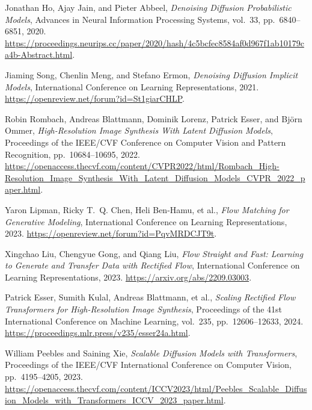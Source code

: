 
Jonathan Ho, Ajay Jain, and Pieter Abbeel,
\textit{Denoising Diffusion Probabilistic Models},
Advances in Neural Information Processing Systems, vol.~33, pp.~6840--6851, 2020.
\url{https://proceedings.neurips.cc/paper/2020/hash/4c5bcfec8584af0d967f1ab10179ca4b-Abstract.html}.

Jiaming Song, Chenlin Meng, and Stefano Ermon,
\textit{Denoising Diffusion Implicit Models},
International Conference on Learning Representations, 2021.
\url{https://openreview.net/forum?id=St1giarCHLP}.

Robin Rombach, Andreas Blattmann, Dominik Lorenz, Patrick Esser, and Bj\"orn Ommer,
\textit{High-Resolution Image Synthesis With Latent Diffusion Models},
Proceedings of the IEEE/CVF Conference on Computer Vision and Pattern Recognition, pp.~10684--10695, 2022.
\url{https://openaccess.thecvf.com/content/CVPR2022/html/Rombach_High-Resolution_Image_Synthesis_With_Latent_Diffusion_Models_CVPR_2022_paper.html}.

Yaron Lipman, Ricky T.~Q. Chen, Heli Ben-Hamu, et al.,
\textit{Flow Matching for Generative Modeling},
International Conference on Learning Representations, 2023.
\url{https://openreview.net/forum?id=PqvMRDCJT9t}.

Xingchao Liu, Chengyue Gong, and Qiang Liu,
\textit{Flow Straight and Fast: Learning to Generate and Transfer Data with Rectified Flow},
International Conference on Learning Representations, 2023.
\url{https://arxiv.org/abs/2209.03003}.

Patrick Esser, Sumith Kulal, Andreas Blattmann, et al.,
\textit{Scaling Rectified Flow Transformers for High-Resolution Image Synthesis},
Proceedings of the 41st International Conference on Machine Learning, vol.~235, pp.~12606--12633, 2024.
\url{https://proceedings.mlr.press/v235/esser24a.html}.

William Peebles and Saining Xie,
\textit{Scalable Diffusion Models with Transformers},
Proceedings of the IEEE/CVF International Conference on Computer Vision, pp.~4195--4205, 2023.
\url{https://openaccess.thecvf.com/content/ICCV2023/html/Peebles_Scalable_Diffusion_Models_with_Transformers_ICCV_2023_paper.html}.

